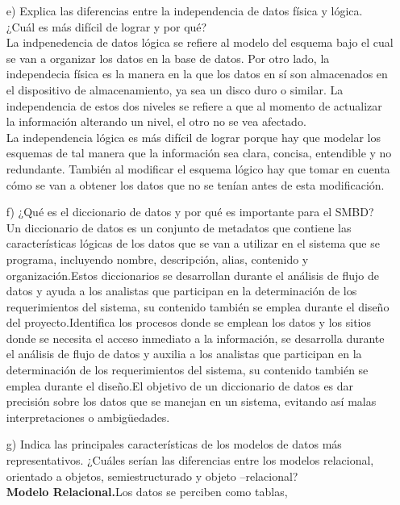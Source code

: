 \documentclass[a4paper, 12pt]{report}
\begin{document}
\begin{enumerate}
{\begin{enumerate}
\begin{itemize}
     \end{itemize}
    \item[e)]{Explica las diferencias entre la independencia de datos física y
                lógica. ¿Cuál es más difícil de lograr y por qué?\\
        La indpenedencia de datos lógica se refiere al modelo del esquema bajo el
        cual se van a organizar los datos en la base de datos. Por otro lado,
        la independecia física es la manera en la que los datos en sí son almacenados
        en el dispositivo de almacenamiento, ya sea un disco duro o similar.
        La independencia de estos dos niveles se refiere a que al momento de
        actualizar la información alterando un nivel, el otro no se vea afectado.\\
        La independencia lógica es más difícil de lograr porque hay que modelar los
        esquemas de tal manera que la información sea clara, concisa, entendible y no
        redundante. También al modificar el esquema lógico hay que tomar en cuenta cómo
        se van a obtener los datos que no se tenían antes de esta modificación.
    }
    \item[f)]{¿Qué es el diccionario de datos y por qué es importante para el SMBD?}\\
    Un diccionario de datos es un conjunto de metadatos que contiene las características lógicas de los datos que se van a utilizar en el sistema que se programa, incluyendo nombre, descripción, alias, contenido y organización.Estos diccionarios se desarrollan durante el análisis de flujo de datos y ayuda a los analistas que participan en la determinación de los requerimientos del sistema, su contenido también se emplea durante el diseño del proyecto.Identifica los procesos donde se emplean los datos y los sitios donde se necesita el acceso inmediato a la información, se desarrolla durante el análisis de flujo de datos y auxilia a los analistas que participan en la determinación de los requerimientos del sistema, su contenido también se emplea durante el diseño.El objetivo de un diccionario de datos es dar precisión sobre los datos que se manejan en un sistema, evitando así malas interpretaciones o ambigüedades.
    \item[g)]{Indica las principales características de los modelos de
    datos más representativos. ¿Cuáles serían las diferencias
    entre los  modelos relacional, orientado a objetos,
    semiestructurado y objeto –relacional?\\
    \textbf{Modelo Relacional.}Los datos se perciben como tablas,
}
\end{enumerate}}
\end{enumerate}
\end{document}
